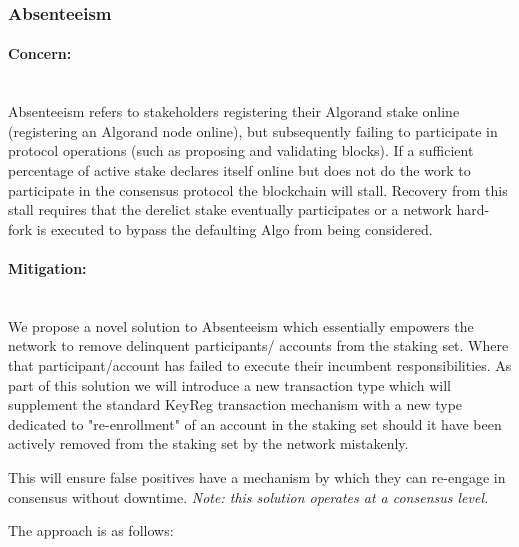 \documentclass[11pt,a4paper]{article}
\begin{document}
\subsubsection{Absenteeism} \label{subsubsec:absenteeism}

\paragraph{Concern:} \mbox{}\\
Absenteeism refers to stakeholders registering their Algorand stake online (registering an Algorand node online), but 
subsequently failing to participate in protocol operations (such as proposing and validating blocks). If a sufficient 
percentage of active stake declares itself online but does not do the work to participate in the consensus protocol the 
blockchain will stall. Recovery from this stall requires that the derelict stake eventually participates or a network 
hard-fork is executed to bypass the defaulting Algo from being considered. 

\paragraph{Mitigation:} \mbox{}\\
We propose a novel solution to Absenteeism which essentially empowers the network to remove delinquent participants/
accounts from the staking set. Where that participant/account has failed to execute their incumbent responsibilities.
As part of this solution we will introduce a new transaction type which will supplement the standard \gls{KeyReg} 
transaction mechanism with a new type dedicated to "re-enrollment" of an account in the staking set should it have been 
actively removed from the staking set by the network mistakenly.

This will ensure false positives have a mechanism by which they can re-engage in consensus without downtime.
\emph{Note: this solution operates at a consensus level.}

The approach is as follows:
\end{document}
